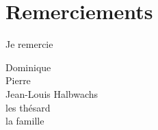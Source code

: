 



\bigskip

\begingroup
\let\clearpage\relax
\let\cleardoublepage\relax
\let\cleardoublepage\relax
\chapter*{Remerciements}

Je remercie

Dominique \\

Pierre\\

Jean-Louis Halbwachs\\

les thésard \\

la famille\\


\endgroup



